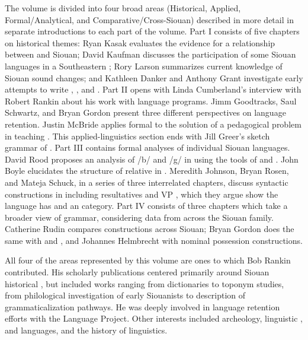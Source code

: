 \begin{refsection}
The volume is divided into four broad areas (Historical, Applied, Formal/Analy\-tical, and Comparative/Cross-Siouan) described in more detail in separate introductions to each part of the volume. Part I consists of five chapters on historical themes: Ryan Kasak evaluates the evidence for a relationship between  and Siouan; David Kaufman discusses the participation of some Siouan languages in a Southeastern ; Rory Larson summarizes current knowledge of Siouan sound changes; and Kathleen Danker and Anthony Grant investigate early attempts to write , , and .  Part II opens with Linda Cumberland's interview with Robert Rankin about his work with  language programs. Jimm Goodtracks, Saul Schwartz, and Bryan Gordon present three different perspectives on  language retention. Justin McBride applies formal  to the solution of a pedagogical problem in teaching . This applied-linguistics section ends with Jill Greer's sketch grammar of . Part III contains formal analyses of individual Siouan languages. David Rood proposes an analysis of /b/ and /g/ in  using the tools of  and . John Boyle elucidates the structure of relative  in . Meredith Johnson, Bryan Rosen, and Mateja Schuck, in a series of three interrelated chapters, discuss syntactic constructions in  including resultatives and VP , which they argue show the language has  and an  category. Part IV consists of three chapters which take a broader view of grammar, considering data from across the Siouan family. Catherine Rudin compares  constructions across Siouan; Bryan Gordon does the same with  and , and Johannes Helmbrecht with nominal possession constructions. 

All four of the areas represented by this volume are ones to which Bob Rankin contributed. His scholarly publications centered primarily around Siouan historical , but included works ranging from dictionaries to toponym studies, from philological investigation of early Siouanists  to description of grammaticalization pathways. He was deeply involved in language retention efforts with the  Language Project. Other interests included archeology, linguistic ,  and  languages, and the history of linguistics. 


\end{refsection}
